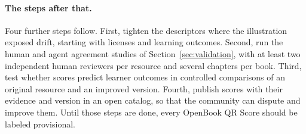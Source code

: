 \paragraph{The steps after that.}
Four further steps follow. First, tighten the descriptors where the illustration exposed drift, starting with licenses and learning outcomes. Second, run the human and agent agreement studies of Section~\ref{sec:validation}, with at least two independent human reviewers per resource and several chapters per book. Third, test whether scores predict learner outcomes in controlled comparisons of an original resource and an improved version. Fourth, publish scores with their evidence and version in an open catalog, so that the community can dispute and improve them. Until those steps are done, every OpenBook QR Score should be labeled provisional.
